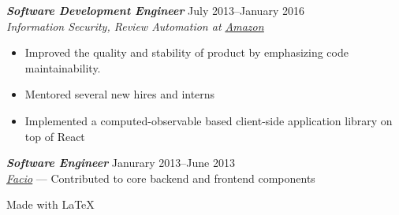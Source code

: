 \documentclass[line,letterpaper]{resume}
\begin{document}
\begin{resume}
    {\sl\textbf{Software Development Engineer}} \hfill July 2013--January
    2016\\
    \emph{Information Security, Review Automation at
    \underline{\href{http://www.amazon.com/}{Amazon}}}
    \begin{itemize}
        \item Improved the quality and stability of product by emphasizing code
            maintainability.
        \item Mentored several new hires and interns
        \item Implemented a computed-observable based client-side application
            library on top of React
    \end{itemize}
    \vspace{6pt}

    {\sl\textbf{Software Engineer}} \hfill Janurary 2013--June 2013\\
    \emph{\underline{\href{http://www.facio.com/}{Facio}}} --- Contributed to core backend and frontend components
    \vspace{6pt}

\end{resume}

\vspace{50pt}

\hfill Made with \LaTeX{}
\end{document}
